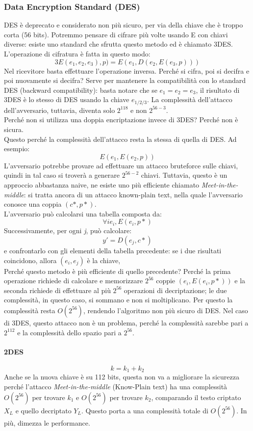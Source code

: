 \documentclass[a4paper,12pt]{article}
\begin{document}
\subsubsection{Data Encryption Standard (DES)}
DES è deprecato e considerato non più sicuro, per via della chiave che è troppo corta (56 bits). Potremmo pensare di cifrare più volte usando E con chiavi diverse: esiste uno standard che sfrutta questo metodo ed è chiamato 3DES.\\
L'operazione di cifratura è fatta in questo modo:
$$3E(e_1, e_2, e_3), p) = E (e_1, D(e_2, E(e_3, p)))$$
Nel ricevitore basta effettuare l'operazione inversa. Perché si cifra, poi si decifra e poi nuovamente si decifra? 
Serve per mantenere la compatibilità con lo standard DES (backward compatibility): basta notare che se $e_1 = e_2 = e_3$, il risultato di 3DES è lo stesso di DES usando la chiave $e_{1/2/3}$.
La complessità dell'attacco dell'avversario, tuttavia, diventa solo $2^{118}$ e non $2^{56-3}$. \\
Perché non si utilizza una doppia encriptazione invece di 3DES? Perché non è sicura. \\
Questo perché la complessità dell'attacco resta la stessa di quella di DES. Ad esempio:
$$E(e_1, E(e_2, p))$$
L'avversario potrebbe provare ad effettuare un attacco bruteforce sulle chiavi, quindi in tal caso si troverà a generare $2^{56-2}$ chiavi.
Tuttavia, questo è un approccio abbastanza naive, ne esiste uno più efficiente chiamato \textit{Meet-in-the-middle}: si tratta ancora di un attacco known-plain text, nella quale l'avversario conosce una coppia $(c*, p*)$. \\
L'avversario può calcolarsi una tabella composta da:
$$\forall i  e_i, E(e_i, p*)$$
Successivamente, per ogni \textit{j}, può calcolare:
$$y' = D(e_j, c*)$$
e confrontarlo con gli elementi della tabella precedente: se i due risultati coincidono, allora $(e_i,e_j)$ è la chiave, \\
Perché questo metodo è più efficiente di quello precedente? Perché la prima operazione richiede di calcolare e memorizzare $2^56$ coppie $(e_i, E(e_i, p*))$
e la seconda richiede di effettuare al più $2^{56}$ operazioni di decriptazione; le due complessità, in questo caso, si sommano e non si moltiplicano. Per questo la complessità resta $O(2^{56})$,
rendendo l'algoritmo non più sicuro di DES. Nel caso di 3DES, questo attacco non è un problema, perché la complessità sarebbe pari a $2^{112}$ e la complessità dello spazio pari a $2^{56}$.

\paragraph{2DES}
$$k = k_1 + k_2$$
Anche se la nuova chiave è su 112 bits, questa non va a migliorare la sicurezza perché l'attacco \textit{Meet-in-the-middle} (Know-Plain text) ha una complessità $O(2^{56})$ per trovare $k_1$ e $O(2^{56})$ per trovare $k_2$, comparando il testo criptato $X_L$ e quello decriptato $Y_L$. Questo porta a una complessità totale di $O(2^{56})$. In più, dimezza le performance.
\end{document}

